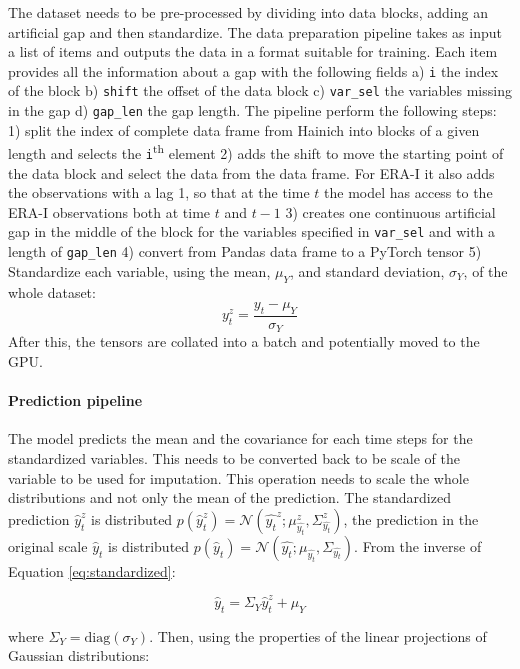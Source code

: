 \documentclass{article}
\newcommand{\norm}[3]{\mathcal{N}\left(#1; #2, #3\right)} %
\begin{document}
The dataset needs to be pre-processed by dividing into data blocks, adding an artificial gap and then standardize. The data preparation pipeline takes as input a list of items and outputs the data in a format suitable for training. Each item provides all the information about a gap with the following fields a) \verb|i| the index of the block b) \verb|shift|  the offset of the data block c) \verb|var_sel| the variables missing in the gap d) \verb|gap_len| the gap length. The pipeline perform the following steps: 1) split the index of complete data frame from Hainich into blocks of a given length and selects the \texttt{i}\textsuperscript{th} element  2) adds the shift to move the starting point of the data block and select the data from the data frame. For ERA-I it also adds the observations with a lag 1, so that at the time $t$ the model has access to the ERA-I observations both at time $t$ and $t-1$ 3) creates one continuous artificial gap in the middle of the block for the variables specified in \verb|var_sel| and with a length of \verb|gap_len| 4) convert from \textsf{Pandas} data frame to a \textsf{PyTorch} tensor 5) Standardize each variable, using the mean, $\mu_Y$, and standard deviation, $\sigma_Y$, of the whole dataset:
\begin{equation}\label{eq:standardized}
    y^z_t = \frac{y_t - \mu_Y}{\sigma_Y}
\end{equation}
After this, the tensors are collated into a batch and potentially moved to the GPU.

\paragraph{Prediction pipeline} The model predicts the mean and the covariance for each time steps for the standardized variables. This needs to be converted back to be scale of the variable to be used for imputation. This operation needs to scale the whole distributions and not only the mean of the prediction. The standardized prediction $\hat{y}^z_t$ is distributed $p(\hat{y}^z_t) = \norm{\hat{y_t}^z}{\mu^z_{\hat{y_t}}}{\Sigma^z_{\hat{y_t}}}$, the prediction in the original scale $\hat{y}_t$ is distributed $p(\hat{y}_t) =  \norm{\hat{y_t}}{\mu_{\hat{y_t}}}{\Sigma_{\hat{y_t}}}$. From the inverse of Equation \ref{eq:standardized}:

\begin{equation*}
    \hat{y}_t = \Sigma_Y\hat{y}^z_t + \mu_Y
\end{equation*}

where $\Sigma_Y = \text{diag}(\sigma_Y)$. Then, using the properties of the linear projections of Gaussian distributions:
\end{document}
